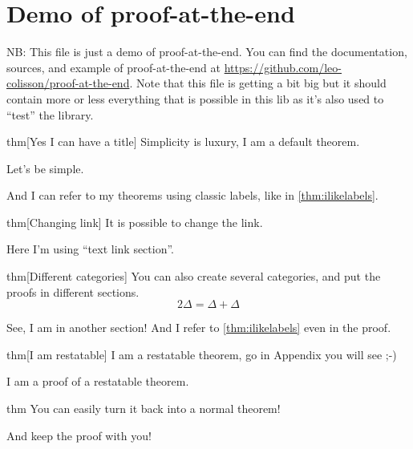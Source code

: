 \documentclass{article}
\begin{document}
\section{Demo of proof-at-the-end}

NB: This file is just a demo of proof-at-the-end.  You can find the documentation, sources, and example of proof-at-the-end at \url{https://github.com/leo-colisson/proof-at-the-end}. Note that this file is getting a bit big but it should contain more or less everything that is possible in this lib as it's also used to ``test'' the library.

\begin{theoremEnd}{thm}[Yes I can have a title]
  \label{thm:ilikelabels}
  Simplicity is luxury, I am a default theorem.
\end{theoremEnd}
\begin{proofEnd}
  Let's be simple.  
\end{proofEnd}

And I can refer to my theorems using classic labels, like in \autoref{thm:ilikelabels}.

\begin{theoremEnd}{thm}[Changing link]
  It is possible to change the link.
\end{theoremEnd}
\begin{proofEnd}
  Here I'm using ``text link section''.
\end{proofEnd}

\begin{theoremEnd}[category=greattheorem, end]{thm}[Different categories]
  You can also create several categories, and put the proofs in different sections.
  \[2\Delta = \Delta + \Delta\]
\end{theoremEnd}
\begin{proofEnd}
  See, I am in another section! And I refer to \autoref{thm:ilikelabels} even in the proof.
\end{proofEnd}

\begin{theoremEnd}[restate]{thm}[I am restatable]
  I am a restatable theorem, go in Appendix you will see ;-)
\end{theoremEnd}
\begin{proofEnd}
  I am a proof of a restatable theorem.  
\end{proofEnd}


\begin{theoremEnd}[normal]{thm}
  You can easily turn it back into a normal theorem!
\end{theoremEnd}
\begin{proofEnd}
  And keep the proof with you!  
\end{proofEnd}
\end{document}
